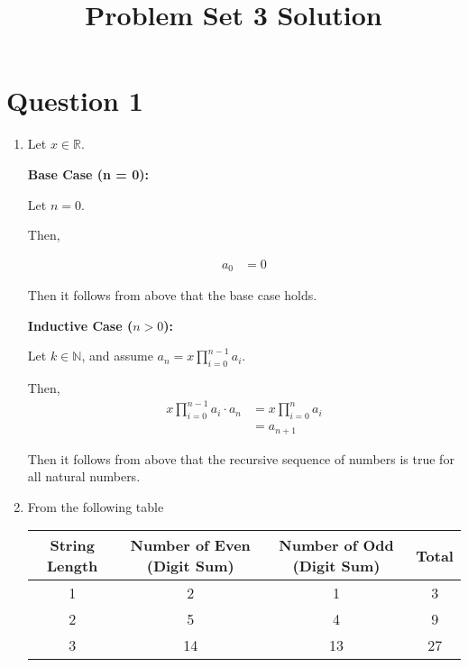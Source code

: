 \documentclass[12pt]{article}
\begin{document}
\title{Problem Set 3 Solution}
\maketitle

\section*{Question 1}
\begin{enumerate}
    \item

    Let $x \in \mathbb{R}$.

    \bigskip

    \textbf{Base Case (n = 0):}

    \bigskip

    Let $n = 0$.

    \bigskip

    Then,

    \begin{align}
        a_0 &= 0
    \end{align}

    \bigskip

    Then it follows from above that the base case holds.

    \bigskip

    \textbf{Inductive Case ($n > 0$):}

    \bigskip

    Let $k \in \mathbb{N}$, and assume $a_n = x\prod\limits_{i=0}^{n-1} a_i$.

    \bigskip

    Then,
    \setcounter{equation}{0}
    \begin{align}
        x\prod\limits_{i=0}^{n-1} a_i \cdot a_n &= x\prod\limits_{i=0}^{n} a_i\\
        &= a_{n+1}
    \end{align}

    \bigskip

    Then it follows from above that the recursive sequence of numbers is true for
    all natural numbers.

    \item

    From the following table

    \begin{tabular}{c|c|c|c}
        String Length & Number of Even (Digit Sum) & Number of Odd (Digit Sum) & Total\\
        \hline
        1 & 2 & 1 & 3\\
        \hline
        2 & 5 & 4 & 9\\
        \hline
        3 & 14 & 13 & 27
    \end{tabular}


\end{enumerate}
\end{document}
